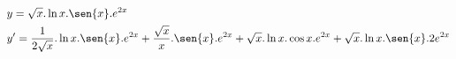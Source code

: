 \begin{ex}
\begin{align}
&y=\sqrt{x}.\ln{x}.\sen{x}.e^{2x}\nonumber\\
&y'=\frac{1}{2\sqrt{x}}.\ln{x}.\sen{x}.e^{2x}+\frac{\sqrt{x}}{x}.\sen{x}.e^{2x}+\sqrt{x}.\ln{x}.\cos{x}.e^{2x}+\sqrt{x}.\ln{x}.\sen{x}.2e^{2x}\nonumber
\end{align}
\end{ex}
